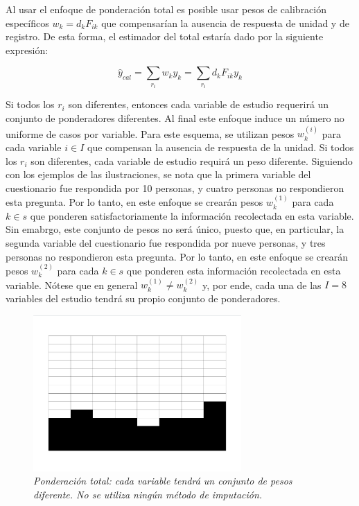 \documentclass[
  10pt,
  spanish,
]{book}
\begin{document}
Al usar el enfoque de ponderación total es posible usar pesos de calibración específicos \(w_k = d_k F_{ik}\) que compensarían la ausencia de respuesta de unidad y de registro. De esta forma, el estimador del total estaría dado por la siguiente expresión:

\[
\hat{y}_{cal}=\sum_{r_i}w_ky_k = 
\sum_{r_i}d_k F_{ik} y_k
\]

Si todos los \(r_i\) son diferentes, entonces cada variable de estudio requerirá un conjunto de ponderadores diferentes. Al final este enfoque induce un número no uniforme de casos por variable. Para este esquema, se utilizan pesos \(w_k^{(i)}\) para cada variable \(i \in I\) que compensan la ausencia de respuesta de la unidad. Si todos los \(r_i\) son diferentes, cada variable de estudio requirá un peso diferente. Siguiendo con los ejemplos de las ilustraciones, se nota que la primera variable del cuestionario fue respondida por 10 personas, y cuatro personas no respondieron esta pregunta. Por lo tanto, en este enfoque se crearán pesos \(w_k^{(1)}\) para cada \(k\in s\) que ponderen satisfactoriamente la información recolectada en esta variable. Sin emabrgo, este conjunto de pesos no será único, puesto que, en particular, la segunda variable del cuestionario fue respondida por nueve personas, y tres personas no respondieron esta pregunta. Por lo tanto, en este enfoque se crearán pesos \(w_k^{(2)}\) para cada \(k\in s\) que ponderen esta información recolectada en esta variable. Nótese que en general \(w_k^{(1)} \neq w_k^{(2)}\) y, por ende, cada una de las \(I=8\) variables del estudio tendrá su propio conjunto de ponderadores.

\begin{figure}
\centering
\includegraphics[width=3.125in,height=\textheight]{Pics/j4.png}
\caption{\emph{Ponderación total: cada variable tendrá un conjunto de pesos diferente. No se utiliza ningún método de imputación.}}
\end{figure}
\end{document}
